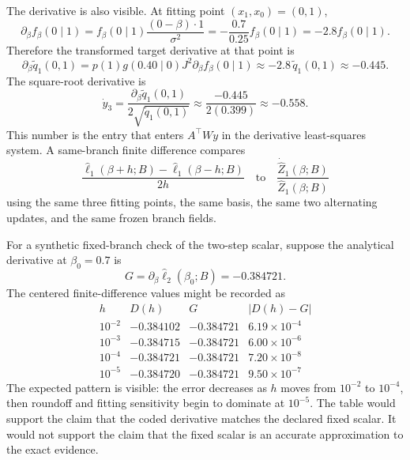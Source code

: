 \documentclass[11pt]{article}
\numberwithin{equation}{section}
\newcommand{\widehatell}{\widehat\ell}
\begin{document}
The derivative is also visible.  At fitting point \((x_1,x_0)=(0,1)\),
\begin{equation}
    \partial_\beta f_\beta(0\mid1)
    =
    f_\beta(0\mid1)\frac{(0-\beta)\cdot1}{\sigma^2}
    =
    -\frac{0.7}{0.25}f_\beta(0\mid1)
    =
    -2.8 f_\beta(0\mid1).
    \label{eq:p25-trace2-17}
\end{equation}
Therefore the transformed target derivative at that point is
\begin{equation}
    \partial_\beta\widetilde q_1(0,1)
    =
    p(1)g(0.40\mid0)J^2\partial_\beta f_\beta(0\mid1)
    \approx
    -2.8\,\widetilde q_1(0,1)
    \approx
    -0.445.
    \label{eq:p25-trace2-18}
\end{equation}
The square-root derivative is
\begin{equation}
    \dot y_3
    =
    \frac{\partial_\beta\widetilde q_1(0,1)}
    {2\sqrt{\widetilde q_1(0,1)}}
    \approx
    \frac{-0.445}{2(0.399)}
    \approx
    -0.558.
    \label{eq:p25-trace2-19}
\end{equation}
This number is the entry that enters \(A^\top W\dot y\) in the derivative
least-squares system.  A same-branch finite difference compares
\begin{equation}
    \frac{\widehat\ell_1(\beta+h;B)-\widehat\ell_1(\beta-h;B)}{2h}
    \quad\text{to}\quad
    \frac{\dot{\widehat Z}_1(\beta;B)}{\widehat Z_1(\beta;B)}
    \label{eq:p25-trace2-20}
\end{equation}
using the same three fitting points, the same basis, the same two alternating
updates, and the same frozen branch fields.

For a synthetic fixed-branch check of the two-step scalar, suppose the
analytical derivative at \(\beta_0=0.7\) is
\begin{equation}
    G=\partial_\beta\widehatell_2(\beta_0;B)=-0.384721.
    \label{eq:p26-trace-fd-table-1}
\end{equation}
The centered finite-difference values might be recorded as
\begin{equation}
\begin{array}{c|c|c|c}
h & D(h) & G & |D(h)-G|\\
\hline
10^{-2} & -0.384102 & -0.384721 & 6.19\times10^{-4}\\
10^{-3} & -0.384715 & -0.384721 & 6.00\times10^{-6}\\
10^{-4} & -0.384721 & -0.384721 & 7.20\times10^{-8}\\
10^{-5} & -0.384720 & -0.384721 & 9.50\times10^{-7}
\end{array}
    \label{eq:p26-trace-fd-table-2}
\end{equation}
The expected pattern is visible: the error decreases as \(h\) moves from
\(10^{-2}\) to \(10^{-4}\), then roundoff and fitting sensitivity begin to
dominate at \(10^{-5}\).  The table would support the claim that the coded
derivative matches the declared fixed scalar.  It would not support the claim
that the fixed scalar is an accurate approximation to the exact evidence.
\end{document}
